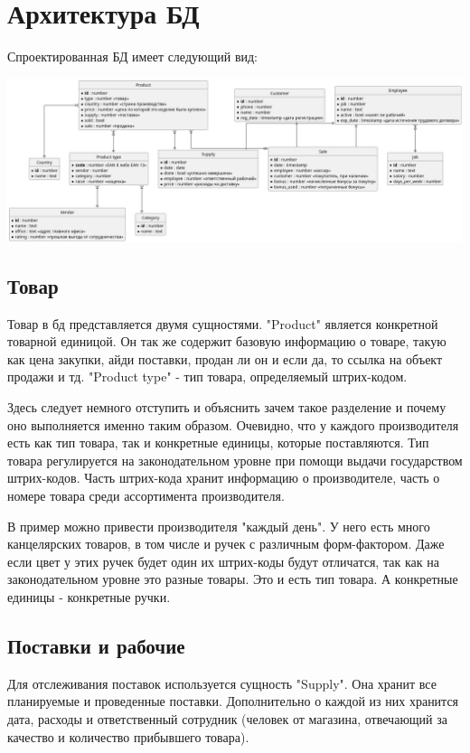 \section{Архитектура БД}

Спроектированная БД имеет следующий вид:

\includegraphics[width=16cm]{res/diagram.png}

\subsection{Товар}

Товар в бд представляется двумя сущностями. "Product" является конкретной товарной единицой. Он так же содержит базовую информацию о товаре, такую как цена закупки, айди поставки, продан ли он и если да, то ссылка на объект продажи и тд. "Product type" - тип товара, определяемый штрих-кодом.

Здесь следует немного отступить и объяснить зачем такое разделение и почему оно выполняется именно таким образом. Очевидно, что у каждого производителя есть как тип товара, так и конкретные единицы, которые поставляются. Тип товара регулируется на законодательном уровне при помощи выдачи государством штрих-кодов. Часть штрих-кода хранит информацию о производителе, часть о номере товара среди ассортимента производителя.

В пример можно привести производителя "каждый день". У него есть много канцелярских товаров, в том числе и ручек с различным форм-фактором. Даже если цвет у этих ручек будет один их штрих-коды будут отличатся, так как на законодательном уровне это разные товары. Это и есть тип товара. А конкретные единицы - конкретные ручки.

\subsection{Поставки и рабочие}

Для отслеживания поставок используется сущность "Supply". Она хранит все планируемые и проведенные поставки. Дополнительно о каждой из них хранится дата, расходы и ответственный сотрудник (человек от магазина, отвечающий за качество и количество прибывшего товара).

